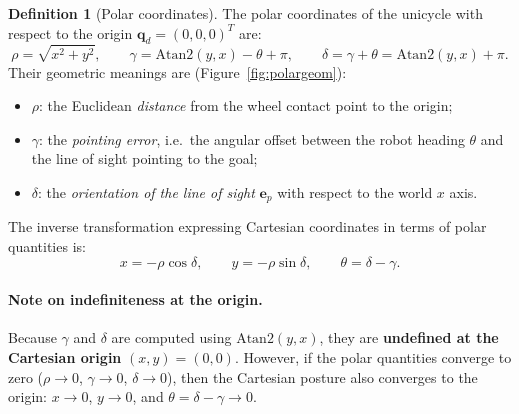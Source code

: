 \documentclass[11pt,a4paper]{article}
\theoremstyle{plain}
\theoremstyle{definition}
\newtheorem{definition}[theorem]{Definition}
\theoremstyle{remark}
\begin{document}
\begin{definition}[Polar coordinates]
The polar coordinates of the unicycle with respect to the origin $\bm q_d=(0,0,0)^T$ are:
\[
\rho=\sqrt{x^2+y^2},\qquad
\gamma=\mathrm{Atan2}(y,x)-\theta+\pi,\qquad
\delta=\gamma+\theta=\mathrm{Atan2}(y,x)+\pi .
\]
Their geometric meanings are (Figure~\ref{fig:polargeom}):
\begin{itemize}[leftmargin=*,nosep]
\item $\rho$: the Euclidean \emph{distance} from the wheel contact point to the origin;
\item $\gamma$: the \emph{pointing error}, i.e.\ the angular offset between the robot heading $\theta$ and the line of sight pointing to the goal;
\item $\delta$: the \emph{orientation of the line of sight} $\bm e_p$ with respect to the world $x$ axis.
\end{itemize}
\end{definition}

The inverse transformation expressing Cartesian coordinates in terms of polar quantities is:
\[
x=-\rho\cos\delta,\qquad y=-\rho\sin\delta,\qquad \theta=\delta-\gamma .
\]

\paragraph{Note on indefiniteness at the origin.}
Because $\gamma$ and $\delta$ are computed using $\mathrm{Atan2}(y,x)$, they are \textbf{undefined at the Cartesian origin} $(x,y)=(0,0)$. However, if the polar quantities converge to zero ($\rho\to0$, $\gamma\to0$, $\delta\to0$), then the Cartesian posture also converges to the origin: $x\to0$, $y\to0$, and $\theta=\delta-\gamma\to0$.
\end{document}
